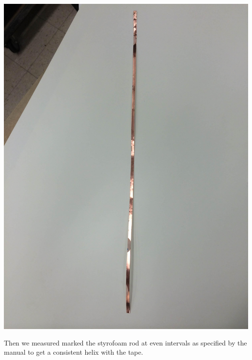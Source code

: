 \documentclass[11pt]{article} %
\begin{document}
\begin{center}
\includegraphics[scale=0.10]{feed/09.jpeg}
\end{center}

Then we measured marked the styrofoam rod at even intervals as specified by the manual to get a consistent helix with the tape. 
\end{document}
